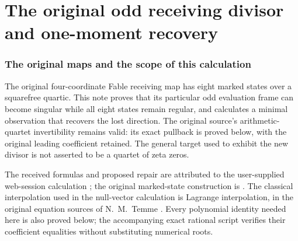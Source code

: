 

\clearpage\begingroup
\part*{The original odd receiving divisor and one-moment recovery}
\newtheorem{sfrepairtheorem}{Theorem}
\newtheorem{sfrepairproposition}[sfrepairtheorem]{Proposition}
\newcommand{\sfrepairC}{\mathbb C}
\newcommand{\sfrepairdd}{\mathfrak D_{\rm odd}}
\newcommand{\sfrepairrem}{\operatorname{rem}}
\newcommand{\sfrepairdiag}{\operatorname{diag}}


\section{The original maps and the scope of this calculation}
The original four-coordinate Fable receiving map has eight marked states
over a squarefree quartic. This note proves that its particular odd
evaluation frame can become singular while all eight states remain
regular, and calculates a minimal observation that recovers the lost
direction. The original source's arithmetic-quartet invertibility
remains valid: its exact pullback is proved below, with the original
leading coefficient retained. The general target used to exhibit the
new divisor is not asserted to be a quartet of zeta zeros.

The received formulas and proposed repair are attributed to the
user-supplied web-session calculation \cite{sfrepair:Incoming}; the original
marked-state construction is \cite[SE1--14, GF20--21]{sfrepair:Fable}.
The classical interpolation used in the null-vector calculation is
Lagrange interpolation, in the original equation sources of
N.~M.~Temme \cite{sfrepair:Temme}. Every polynomial identity needed here is
also proved below; the accompanying exact rational script verifies
their coefficient equalities without substituting numerical roots.


